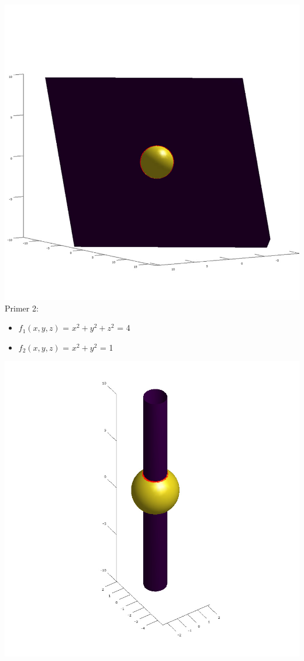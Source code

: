 \documentclass[]{article}
\begin{document}
	\includegraphics[scale=0.3]{primer1_2}
	\\
	Primer 2:
	\begin{itemize}  
		\item $f_{1}(x,y,z)$ = $x^2 + y^2 + z^2$ = 4
		\item $f_{2}(x,y,z)$ = $x^2 + y^2$ = 1
	\end{itemize}
	\includegraphics[scale=0.3]{primer2_1}
\end{document}
